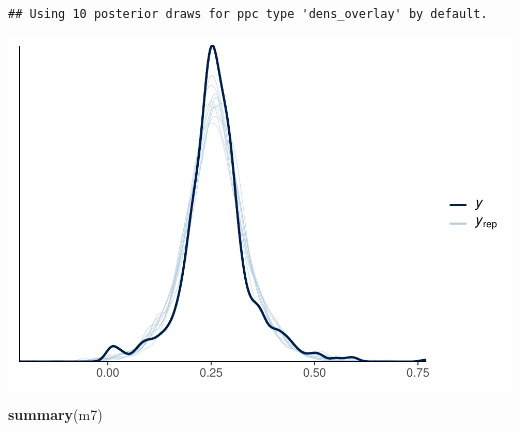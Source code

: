 \documentclass[
]{article}
\newenvironment{Shaded}{\begin{snugshade}}{\end{snugshade}}
\newcommand{\FunctionTok}[1]{\textcolor[rgb]{0.13,0.29,0.53}{\textbf{#1}}}
\newcommand{\NormalTok}[1]{#1}
\begin{document}
\begin{verbatim}
## Using 10 posterior draws for ppc type 'dens_overlay' by default.
\end{verbatim}

\includegraphics{params_analyses_files/figure-latex/unnamed-chunk-8-2.pdf}

\begin{Shaded}
\begin{Highlighting}[]
\FunctionTok{summary}\NormalTok{(m7)}
\end{Highlighting}
\end{Shaded}
\end{document}

